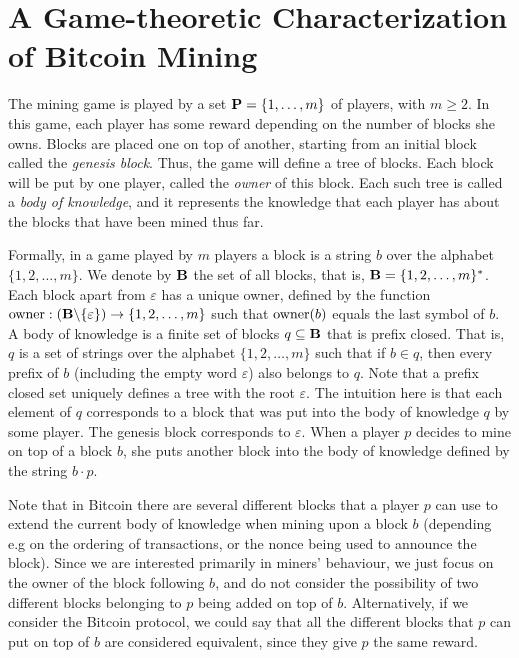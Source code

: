 
\section{A Game-theoretic Characterization of Bitcoin Mining}
\label{sec-formalization}

The mining game is played by a set $\mathbf{P} = \{1, \ldots, m\}$ of players, with $m \geq 2$. In this game, each player has some reward depending on the number of blocks she owns. Blocks are placed one on top of another, starting from an initial block called the {\em genesis block}. Thus, the game will define a tree of blocks. Each block will be put by one player, called the {\em owner} of this block. Each such tree is called a {\em body of knowledge}, and it represents the knowledge that each player has about the blocks that have been mined thus far.

Formally, in a game played by $m$ players a block is a string $b$ over the alphabet $\{1,2,\ldots, m\}$. We denote by $\mathbf{B}$ the set of all blocks, that is, $\mathbf{B} = \{1,2,\ldots , m\}^*$. Each block apart from $\varepsilon$ has a unique owner, defined by the function $\text{\rm owner}: (\mathbf{B} \backslash \{\varepsilon\}) \rightarrow \{1,2,\ldots ,m\}$ such that $\text{\rm owner}(b)$ equals the last symbol of $b$. A body of knowledge is a finite  set of blocks $q \subseteq \mathbf{B}$ that is prefix closed. That is, $q$ is a set of strings over the alphabet $\{1,2,\ldots, m\}$ such that if $b\in q$, then every prefix of $b$ (including the empty word $\varepsilon$) also belongs to $q$. Note that a prefix closed set uniquely defines a tree with the root $\varepsilon$. 
%
The intuition here is that each element of $q$ corresponds to a block that was put into the body of knowledge $q$ by some player. The genesis block corresponds to $\varepsilon$. When a player $p$ decides to mine on top of a block $b$, she puts another block into the body of knowledge defined by the string $b\cdot p$.

Note that in Bitcoin there are several different blocks that a player $p$ can use to extend the current body of knowledge when mining upon a block $b$ (depending e.g on the ordering of transactions, or the nonce being used to announce the block). Since we are interested primarily in miners' behaviour, we just focus on the owner of the block following $b$, and do not consider the possibility of two different blocks belonging to $p$ being added on top of $b$. Alternatively, if we consider the Bitcoin protocol, we could say that all the different blocks that $p$ can put on top of $b$ are considered equivalent, since they give $p$ the same reward. 

